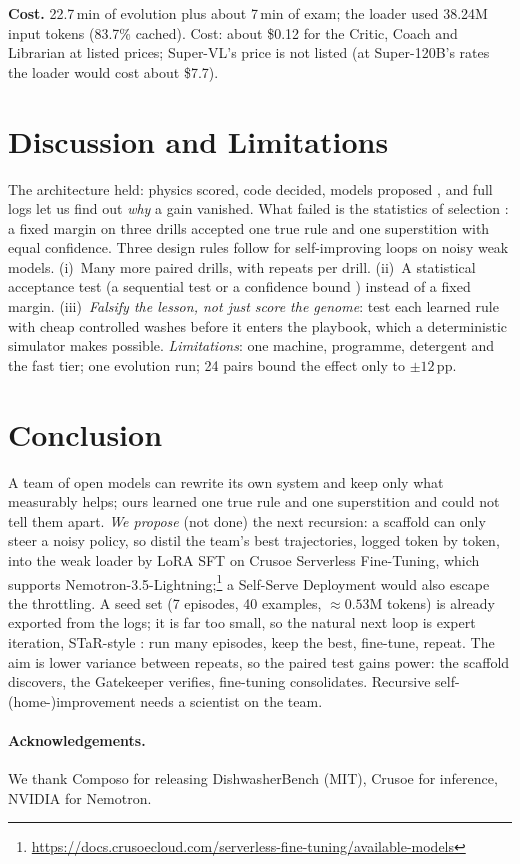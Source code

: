 \documentclass[9pt,twocolumn,letterpaper]{extarticle}
\newcommand{\CacheHit}{83.7\%}
\newcommand{\Cost}{about \$0.12 for the Critic, Coach and Librarian at listed prices; Super-VL's price is not listed (at Super-120B's rates the loader would cost about \$7.7)}
\newcommand{\WallTime}{22.7\,min of evolution plus about 7\,min of exam}
\begin{document}
\textbf{Cost.} \WallTime; the loader used 38.24M input tokens (\CacheHit{} cached). Cost: \Cost.

\section{Discussion and Limitations}
The architecture held: physics scored, code decided, models proposed
\citep{zheng2023judge,amodei2016concrete}, and full logs let us find out \emph{why} a gain vanished. What failed is the statistics of selection
\citep{gelman2013forking,dwork2015reusable,benjamini1995fdr}: a fixed margin on three drills
accepted one true rule and one superstition with equal confidence. Three design rules follow for
self-improving loops on noisy weak models. (i)~Many more paired drills, with repeats per drill.
(ii)~A statistical acceptance test (a sequential test \citep{wald1945sequential} or a confidence
bound \citep{dror2018hitchhiker}) instead of a fixed margin. (iii)~\emph{Falsify the lesson, not
just score the genome}: test each learned rule with cheap controlled washes before it enters the
playbook, which a deterministic simulator makes possible. \emph{Limitations}: one machine, programme, detergent and
the fast tier; one evolution run; 24 pairs bound the effect only to ${\pm}12$\,pp.

\section{Conclusion}
A team of open models can rewrite its own system and keep only what measurably helps; ours learned
one true rule and one superstition and could not tell them apart. \emph{We propose} (not done) the next recursion: a scaffold can only steer a noisy policy, so distil the team's best
trajectories, logged token by token, into the weak loader by LoRA SFT on Crusoe Serverless
Fine-Tuning, which supports Nemotron-3.5-Lightning;\footnote{\url{https://docs.crusoecloud.com/serverless-fine-tuning/available-models}}
a Self-Serve Deployment would also escape the throttling. A seed set (7 episodes, 40 examples,
${\approx}0.53$M tokens) is already exported from the logs; it is far too small, so the natural next
loop is expert iteration, STaR-style \citep{zelikman2022star}: run many episodes, keep the best,
fine-tune, repeat. The aim is lower variance between
repeats, so the paired test gains power: the scaffold discovers, the Gatekeeper verifies,
fine-tuning consolidates. Recursive self-(home-)improvement needs a scientist on the team.

\paragraph{Acknowledgements.} We thank Composo for releasing DishwasherBench (MIT), Crusoe for inference, NVIDIA for Nemotron.

{\scriptsize

}
\end{document}
